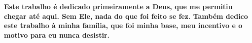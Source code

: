 \thispagestyle{empty}
    \hspace{1cm}
    \vfill
    \hfill
\textbf{Este trabalho é dedicado primeiramente a Deus, que me permitiu chegar até aqui. Sem Ele, nada do que foi feito se fez. Também dedico este trabalho à minha família, que foi minha base, meu incentivo e o motivo para eu nunca desistir.}

    \vspace{2.1cm}
